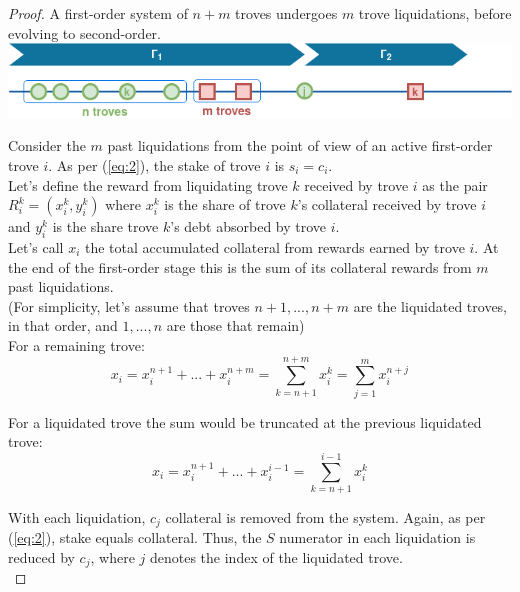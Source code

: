 \documentclass[reqno]{article}
\begin{document}
\begin{proof}
A first-order system of $n+m$ troves undergoes $m$ trove liquidations, before evolving to second-order.\\

    \includegraphics[width=\linewidth]{System_order_evolution_1_proof.png}

Consider the $m$ past liquidations from the point of view of an active first-order trove $i$. As per (\ref{eq:2}), the stake of trove $i$ is $s_i = c_i$.\\

Let’s define the reward from liquidating trove $k$ received by trove $i$ as the pair $R_i^k = (x_i^k, y_i^k)$ where $x_i^k$ is the share of trove $k$’s collateral received by trove $i$ and $y_i^k$ is the share trove $k$’s debt absorbed by trove $i$.\\

Let’s call $x_i$ the total accumulated collateral from rewards earned by trove $i$. At the end of the first-order stage this is the sum of its collateral rewards from $m$ past liquidations.\\

(For simplicity, let’s assume that troves $n+1, ..., n+m$ are the liquidated troves, in that order, and $1, ..., n$ are those that remain)\\

For a remaining trove:\\

\begin{equation} \label{eq:collreward}
  x_i = x_i^{n+1} + ... + x_i^{n+m} = \sum_{k=n+1}^{n+m}x_i^k = \sum_{j=1}^{m}x_i^{n+j}
\end{equation}

For a liquidated trove the sum would be truncated at the previous liquidated trove: \\

\begin{equation}
  x_i = x_i^{n+1} + ... + x_i^{i-1} = \sum_{k=n+1}^{i-1}x_i^k
\end{equation}

With each liquidation, $c_j$ collateral is removed from the system. Again, as per (\ref{eq:2}), stake equals collateral. Thus, the $S$ numerator in each liquidation is reduced by $c_j$, where $j$ denotes the index of the liquidated trove.\\ 



\end{proof}
\end{document}
